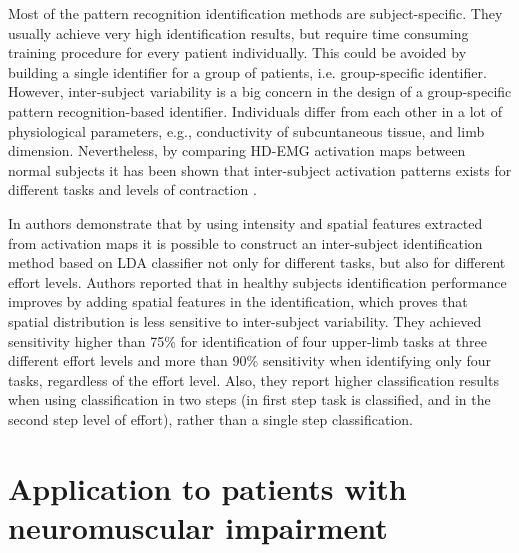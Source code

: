 Most of the pattern recognition identification methods are subject-specific. They usually achieve very high identification results, but require time consuming training procedure for every patient individually. This could be avoided by building a single identifier for a group of patients, i.e. group-specific identifier. However, inter-subject variability is a big concern in the design of a group-specific pattern recognition-based identifier. Individuals differ from each other in a lot of physiological parameters, e.g., conductivity of subcuntaneous tissue, and limb dimension. Nevertheless, by comparing HD-EMG activation maps between normal subjects it has been shown that inter-subject activation patterns exists for different tasks and levels of contraction \citep{Rojas-Martinez2012}.

In \citep{Rojas-Martinez2013} authors demonstrate that by using intensity and spatial features extracted from activation maps it is possible to construct an inter-subject identification method based on LDA classifier not only for different tasks, but also for different effort levels. Authors reported that in healthy subjects identification performance improves by adding spatial features in the identification, which proves that spatial distribution is less sensitive to inter-subject variability. They achieved sensitivity higher than 75\% for identification of four upper-limb tasks at three different effort levels and more than 90\% sensitivity when identifying only four tasks, regardless of the effort level. Also, they report higher classification results when using classification in two steps (in first step task is classified, and in the second step level of effort), rather than a single step classification.


\section{Application to patients with neuromuscular impairment}

